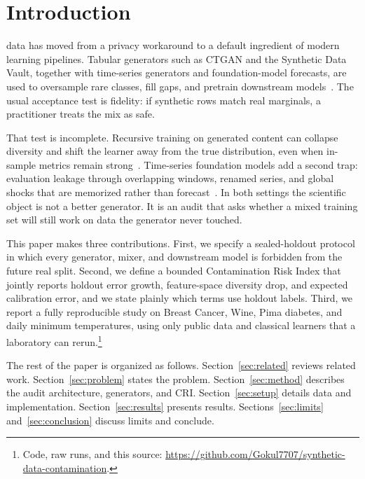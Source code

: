 \documentclass[conference]{IEEEtran}
\begin{document}
\section{Introduction}
 data has moved from a privacy workaround to a default ingredient of modern learning pipelines.
Tabular generators such as CTGAN and the Synthetic Data Vault, together with time-series generators and foundation-model forecasts, are used to oversample rare classes, fill gaps, and pretrain downstream models~\cite{xu2019ctgan,zhao2021ctab,patki2016sdv,yoon2019timegan,park2018tablegan}.
The usual acceptance test is fidelity: if synthetic rows match real marginals, a practitioner treats the mix as safe.

That test is incomplete.
Recursive training on generated content can collapse diversity and shift the learner away from the true distribution, even when in-sample metrics remain strong~\cite{shumailov2024collapse,alemohammad2024mad,bertrand2024stability,dohmatob2024tails}.
Time-series foundation models add a second trap: evaluation leakage through overlapping windows, renamed series, and global shocks that are memorized rather than forecast~\cite{ansari2024chronos,meyer2025leakage}.
In both settings the scientific object is not a better generator.
It is an audit that asks whether a mixed training set will still work on data the generator never touched.

This paper makes three contributions.
First, we specify a sealed-holdout protocol in which every generator, mixer, and downstream model is forbidden from the future real split.
Second, we define a bounded Contamination Risk Index that jointly reports holdout error growth, feature-space diversity drop, and expected calibration error, and we state plainly which terms use holdout labels.
Third, we report a fully reproducible study on Breast Cancer, Wine, Pima diabetes, and daily minimum temperatures, using only public data and classical learners that a laboratory can rerun.\footnote{Code, raw runs, and this source: \url{https://github.com/Gokul7707/synthetic-data-contamination}.}

The rest of the paper is organized as follows.
Section~\ref{sec:related} reviews related work.
Section~\ref{sec:problem} states the problem.
Section~\ref{sec:method} describes the audit architecture, generators, and CRI.
Section~\ref{sec:setup} details data and implementation.
Section~\ref{sec:results} presents results.
Sections~\ref{sec:limits} and~\ref{sec:conclusion} discuss limits and conclude.
\end{document}
